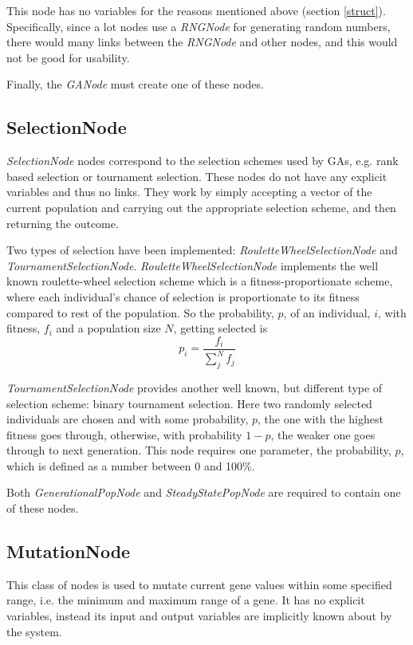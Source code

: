 \documentclass[10pt, notitlepage, a4paper]{article}
\begin{document}
This node has no variables for the reasons mentioned above (section \ref{struct}). Specifically, since a lot nodes use a {\it RNGNode} for generating random numbers, there would many links between the {\it RNGNode} and other nodes, and this would not be good for usability.

Finally, the {\it GANode} must create one of these nodes.

\subsection{SelectionNode}
{\it SelectionNode} nodes correspond to the selection schemes used by GAs, e.g. rank based selection or tournament selection. These nodes do not have any explicit variables and thus no links. They work by simply accepting a vector of the current population and carrying out the appropriate selection scheme, and then returning the outcome.

Two types of selection have been implemented: {\it RouletteWheelSelectionNode} and {\it TournamentSelectionNode}. {\it RouletteWheelSelectionNode} implements the well known roulette-wheel selection scheme which is a fitness-proportionate scheme, where each individual's chance of selection is proportionate to its fitness compared to rest of the population. So the probability, $p$, of an individual, $i$, with fitness, $f_i$ and a population size $N$, getting selected is \[p_i = \frac{f_i}{\sum\limits_{j}^N f_j}\]

{\it TournamentSelectionNode} provides another well known, but different type of selection scheme: binary tournament selection. Here two randomly selected individuals are chosen and with some probability, $p$, the one with the highest fitness goes through, otherwise, with probability $1-p$, the weaker one goes through to next generation. This node requires one parameter, the probability, $p$, which is defined as a number between 0 and 100\%.

Both {\it GenerationalPopNode} and {\it SteadyStatePopNode} are required to contain one of these nodes.

\subsection{MutationNode}
This class of nodes is used to mutate current gene values within some specified range, i.e. the minimum and maximum range of a gene. It has no explicit variables, instead its input and output variables are implicitly known about by the system.
\end{document}

